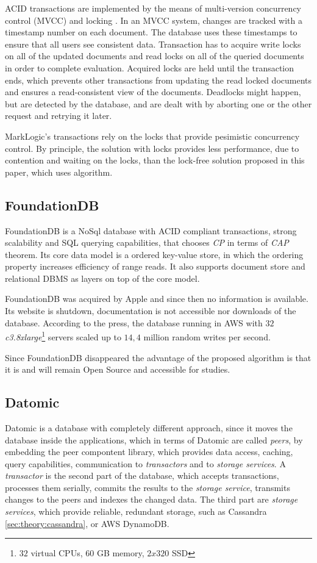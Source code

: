 ACID transactions are implemented by the means of multi-version concurrency control (MVCC) and locking \cite{markLogicUnderstandingTransactions}. In an MVCC system, changes are tracked with a timestamp number on each document. 
The database uses these timestamps to ensure that all users see consistent data. 
Transaction has to acquire write locks on all of the updated documents and read locks on all of the queried documents in order to complete evaluation. Acquired locks are held until the transaction ends, which prevents other transactions from updating the read locked documents and ensures a read-consistent view of the documents. 
Deadlocks might happen, but are detected by the database, and are dealt with by aborting one or the other request and retrying it later.

MarkLogic's transactions rely on the locks that provide pesimistic concurrency control.
By principle, the solution with locks provides less performance, due to contention and waiting on the locks, than the lock-free solution proposed in this paper, which uses \paxos algorithm.


\subsection{FoundationDB}
FoundationDB is a NoSql database with ACID compliant transactions, strong scalability and SQL querying capabilities, that chooses \emph{CP} in terms of \emph{CAP} theorem.
Its core data model is a ordered key-value store, in which the ordering property increases efficiency of range reads. It also supports document store and relational DBMS as layers on top of the core model. 

FoundationDB was acquired by Apple \cite{foundationDbAcquired} and since then no information is available. Its website is shutdown, documentation is not accessible nor downloads of the database. According to the press, the database running in AWS with $32$ \emph{c3.8xlarge}\footnote{$32$ virtual CPUs, $60$ GB memory, $2x320$ SSD} servers scaled up to $14,4$ million random writes per second.

Since FoundationDB disappeared the advantage of the proposed algorithm is that it is and will remain Open Source and accessible for studies.

\subsection{Datomic}
Datomic \cite{datomic} is a database with completely different approach, since it moves the database inside the applications, which in terms of Datomic are called \emph{peers}, by embedding the peer compontent library, which provides data access, caching, query capabilities, communication to \emph{transactors} and to \emph{storage services}. A \emph{transactor} is the second part of the database, which accepts transactions, processes them serially, commits the results to the \emph{storage service}, transmits changes to the peers and indexes the changed data. The third part are \emph{storage services}, which provide reliable, redundant storage, such as Cassandra \ref{sec:theory:cassandra}, or AWS DynamoDB.

